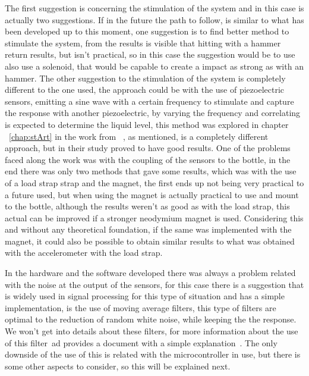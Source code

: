 The first suggestion is concerning the stimulation of the system and in this case is actually two suggestions. If in the future the path to follow, is similar to what has been developed up to this moment, one suggestion is to find better method to stimulate the system, from the results is visible that hitting with a hammer return results, but isn't practical, so in this case the suggestion would be to use also use a solenoid, that would be capable to create a impact as strong as with an hammer. The other suggestion to the stimulation of the system is completely different to the one used, the approach could be with the use of piezoelectric sensors, emitting a sine wave with a certain frequency to stimulate and capture the response with another piezoelectric, by varying the frequency and correlating is expected to determine the liquid level, this method was explored in chapter ~\ref{chap:stArt} in the work from ~\citeauthor{jahnLevelSensorFluids2014a}\cite{jahnLevelSensorFluids2014a}, as mentioned, is a completely different approach, but in their study proved to have good results.   
One of the problems faced along the work was with the coupling of the sensors to the bottle, in the end there was only two methods that gave some results, which was with the use of a load strap strap and the magnet, the first ends up not being very practical to a future used, but when using the magnet is actually practical to use and mount to the bottle, although the results weren't as good as with the load strap, this actual can be improved if a stronger neodymium magnet is used. Considering this and without any theoretical foundation, if the same was implemented with the magnet, it could also be possible to obtain similar results to what was obtained with the accelerometer with the load strap.

In the hardware and the software developed there was always a problem related with the noise at the output of the sensors, for this case there is a suggestion that is widely used in signal processing for this type of situation and has a simple implementation, is the use of moving average filters, this type of filters are optimal to the reduction of random white noise, while keeping the the response. We won't get into details about these filters, for more information about the use of this filter~\acrlong{ad} provides a document with a simple explanation~\cite{smith1997scientist}. The only downside of the use of this is related with the microcontroller in use, but there is some other aspects to consider, so this will be explained next.

